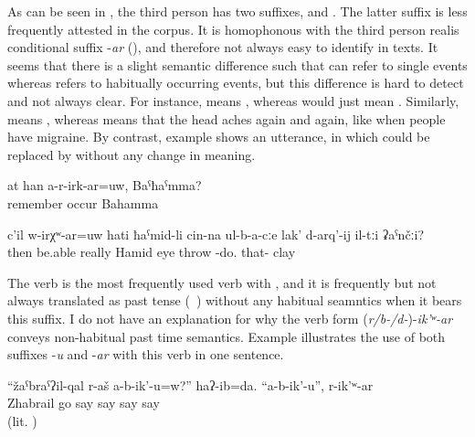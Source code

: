 As can be seen in , the third person has two suffixes,  and . The latter suffix is less frequently attested in the corpus. It is homophonous with the third person realis conditional suffix -\textit{ar} (), and therefore not always easy to identify in texts. It seems that there is a slight semantic difference such that  can refer to single events whereas  refers to habitually occurring events, but this difference is hard to detect and not always clear. For instance,  means , whereas  would just mean . Similarly,  means , whereas  means that the head aches again and again, like when people have migraine.
By contrast, example  shows an utterance, in which  could be replaced by  without any change in meaning.  
\begin{exe}
	\ex	\label{ex:Don't you remember her, Bahamma}
	\gll	at	han	a-r-irk-ar=uw,	Baˁħaˁmma?	\\
			remember	occur		Bahamma\\
	\glt	{}
	
	\ex	\label{ex:Can Hamid really throw clay into his eyes}
	\gll	c'il	w-irχʷ-ar=uw	hati	ħaˁmid-li	cin-na	ul-b-a-cːe	lak'	d-arq'-ij	il-tːi	ʡaˁnčːi?\\
		then	be.able	really	Hamid		eye	throw	-do.	that-	clay\\
	\glt	{}
\end{exe}

The verb   is the most frequently used verb with , and it is frequently but not always translated as past tense (\tie\ ) without any habitual seamntics  when it bears this suffix. I do not have an explanation for why the verb form (\textit{r/b-/d-})-\textit{ik'ʷ-ar} conveys non-habitual past time semantics. Example  illustrates the use of both suffixes -\textit{u} and -\textit{ar} with this verb in one sentence. 

\begin{exe}
	\ex	\label{ex:Zhabrail and his family do not invite you}
	\gll	``žaˁbraˁʔil-qal	r-aš	a-b-ik'-u=w?''	haʔ-ib=da.	``a-b-ik'-u'',	r-ik'ʷ-ar\\
		Zhabrail	go	say	say	say	say\\
	\glt	{} (lit. )
\end{exe}


